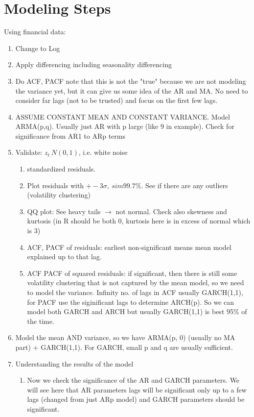 
\section{Modeling Steps}
Using financial data:

\begin{enumerate}
    \item Change to Log
    \item Apply differencing including seasonality differencing 
    \item Do ACF, PACF note that this is not the "true" because we are not modeling the variance yet, but it can give us some idea of the AR and MA. No need to consider far lags (not to be trusted) and focus on the first few lags.
    \item ASSUME CONSTANT MEAN AND CONSTANT VARIANCE. Model ARMA(p,q). Usually just AR with p large (like 9 in example). Check for significance from AR1 to ARp terms
    \item Validate: $z_t~N(0,1)$, i.e. white noise
    \begin{enumerate}
        \item standardized residuals. 
        \item Plot residuals with $ +- 3\sigma, ~sim 99.7\%$. See if there are any outliers (volatility clustering)
        \item QQ plot: See heavy tails $\rightarrow$ not normal. Check also skewness and kurtosis (in R should be both 0, kurtosis here is in excess of normal which is 3)
        \item ACF, PACF of residuals: earliest non-significant means mean model explained up to that lag.
        \item ACF PACF of squared residuals: if significant, then there is still some volatility clustering that is not captured by the mean model, so we need to model the variance. Infinity no. of lags in ACF usually GARCH(1,1), for PACF use the siginificant lags to determine ARCH(p). So we can model both GARCH and ARCH but usually GARCH(1,1) is best 95\% of the time.
    \end{enumerate}
    \item Model the mean AND variance, so we have ARMA(p, 0) (usually no MA part) + GARCH(1,1). For GARCH, small p and q are usually sufficient. 
    \item Understanding the results of the model
    \begin{enumerate}
        \item Now we check the significance of the AR and GARCH parameters. We will see here that AR parameters lags will be significant only up to a few lags (changed from just ARp model) and GARCH parameters should be significant.

\end{enumerate}
\end{enumerate}
